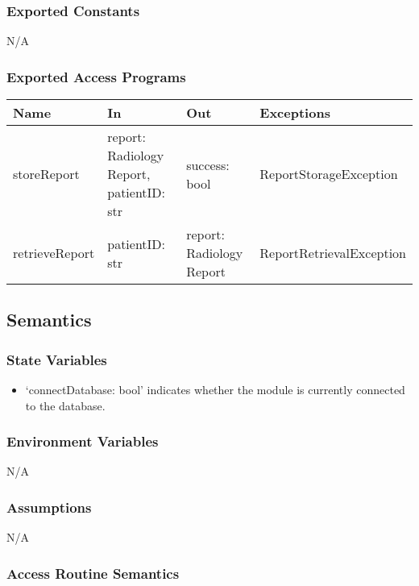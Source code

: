 \documentclass[12pt, titlepage]{article}
\begin{document}
\subsubsection{Exported Constants}
N/A

\subsubsection{Exported Access Programs}

\begin{center}
  \begin{tabular}{p{3cm} p{5cm} p{4cm} p{5cm}}
    \hline
    \textbf{Name} & \textbf{In} & \textbf{Out} & \textbf{Exceptions} \\
    \hline
    storeReport & report: Radiology Report, patientID: str & success: bool &
      ReportStorageException \\
    retrieveReport & patientID: str & report: Radiology Report &
      ReportRetrievalException \\
    \hline
  \end{tabular}
\end{center}

\subsection{Semantics}

\subsubsection{State Variables}
\begin{itemize}
    \item `connectDatabase: bool' indicates whether the module is currently connected to the database.
\end{itemize}

\subsubsection{Environment Variables}
N/A

\subsubsection{Assumptions}
N/A

\subsubsection{Access Routine Semantics}
\end{document}
